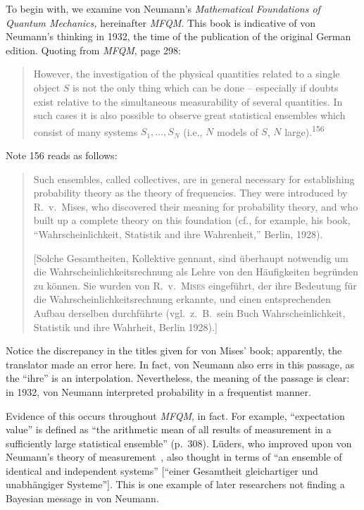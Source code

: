 \documentclass[aps,pra,superscriptaddress,12pt,tightenlines,nofootinbib]{revtex4}
\newcommand{\booktitle}{\textsl}
\newcommand{\MFQM}{\textsl{MFQM}}
\begin{document}
To begin with, we examine von Neumann's \booktitle{Mathematical
  Foundations of Quantum Mechanics,} hereinafter \MFQM.  This book is
indicative of von Neumann's thinking in 1932, the time of the
publication of the original German edition.  Quoting from \MFQM, page
298:
\begin{quotation}
However, the investigation of the physical quantities related to a
single object $S$ is not the only thing which can be done --
especially if doubts exist relative to the simultaneous measurability
of several quantities.  In such cases it is also possible to observe
great statistical ensembles which consist of many systems
$S_1,\ldots,S_N$ (i.e., $N$ models of $S$, $N$
large).\textsuperscript{156}
\end{quotation}
Note 156 reads as follows:
\begin{quotation}
Such ensembles, called collectives, are in general necessary for
establishing probability theory as the theory of frequencies.  They
were introduced by R.\ v.\ Mises, who discovered their meaning for
probability theory, and who built up a complete theory on this
foundation (cf., for example, his book, ``Wahrscheinlichkeit,
Statistik and ihre Wahrenheit,'' Berlin, 1928).

[Solche Gesamtheiten, Kollektive gennant, sind \"uberhaupt notwendig
  um die Wahrscheinlichkeitsrechnung als Lehre von den H\"aufigkeiten
  begr\"unden zu k\"onnen.  Sie wurden von R.\ v.\ \textsc{Mises}
  eingef\"uhrt, der ihre Bedeutung f\"ur die
  Wahrscheinlichkeitsrechnung erkannte, und einen entsprechenden
  Aufbau derselben durchf\"uhrte (vgl.\ z.\ B.\ sein Buch
  Wahrscheinlichkeit, Statistik und ihre Wahrheit, Berlin 1928).]
\end{quotation}
Notice the discrepancy in the titles given for von Mises' book;
apparently, the translator made an error here.  In fact, von Neumann
also errs in this passage, as the ``ihre'' is an interpolation.
Nevertheless, the meaning of the passage is clear: in 1932, von
Neumann interpreted probability in a frequentist manner.

Evidence of this occurs throughout \MFQM, in fact.  For example,
``expectation value'' is defined as ``the arithmetic mean of all
results of measurement in a sufficiently large statistical ensemble''
(p.\ 308).  L\"uders, who improved upon von Neumann's theory of
measurement~\cite{Lueders1951}, also thought in terms of ``an ensemble
of identical and independent systems'' [``einer Gesamtheit
  gleichartiger und unabh\"angiger Systeme''].  This is one example of
later researchers not finding a Bayesian message in von Neumann.
\end{document}
